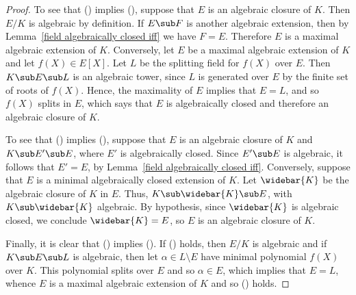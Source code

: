 \begin{proof}
To see that () implies (), suppose that $E$ is an algebraic closure of $K$. Then $E/K$ is algebraic by definition. If $E\sub F$ is another algebraic extension, then by Lemma~\ref{field algebraically closed iff} we have $F=E$. Therefore $E$ is a maximal algebraic extension of $K$. Conversely, let $E$ be a maximal algebraic extension of $K$ and let $f(X)\in E[X]$. Let $L$ be the splitting field for $f(X)$ over $E$. Then $K\sub E\sub L$ is an algebraic tower, since $L$ is generated over $E$ by the finite set of roots of $f(X)$. Hence, the maximality of $E$ implies that $E=L$, and so $f(X)$ splits in $E$, which says that $E$ is algebraically closed and therefore an algebraic closure of $K$.\par
To see that () implies (), suppose that $E$ is an algebraic closure of $K$ and $K\sub E'\sub E$, where $E'$ is algebraically closed. Since $E'\sub E$ is algebraic, it follows that $E'=E$, by Lemma~\ref{field algebraically closed iff}. Conversely, suppose that $E$ is a minimal algebraically closed extension of $K$. Let $\widebar{K}$ be the algebraic closure of $K$ in $E$. Thus, $K\sub\widebar{K}\sub E$, with $K\sub\widebar{K}$ algebraic. By hypothesis, since $\widebar{K}$ is algebraic closed, we conclude $\widebar{K}=E$, so $E$ is an algebraic closure of $K$.\par
Finally, it is clear that () implies (). If () holds, then $E/K$ is algebraic and if $K\sub E\sub L$ is algebraic, then let $\alpha\in L\setminus E$ have minimal polynomial $f(X)$ over $K$. This polynomial splits over $E$ and so $\alpha\in E$, which implies that $E=L$, whence $E$ is a maximal algebraic extension of $K$ and so () holds.
\end{proof}
